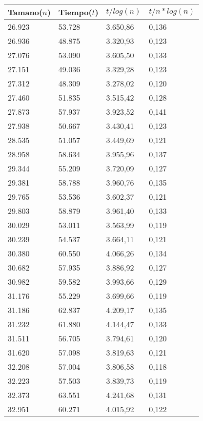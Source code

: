 \begin{table}[H]
\parbox{0.3\textwidth}{
  \begin{tabular}{| l | l | l |l |}
    \hline
    Tamano($n$) & Tiempo($t$) & $t / log(n)$ & $t / n*log(n)$ \\ \hline
26.923	&	53.728	&	3.650,86	&	0,136	\\ \hline
26.936	&	48.875	&	3.320,93	&	0,123	\\ \hline
27.076	&	53.090	&	3.605,50	&	0,133	\\ \hline
27.151	&	49.036	&	3.329,28	&	0,123	\\ \hline
27.312	&	48.309	&	3.278,02	&	0,120	\\ \hline
27.460	&	51.835	&	3.515,42	&	0,128	\\ \hline
27.873	&	57.937	&	3.923,52	&	0,141	\\ \hline
27.938	&	50.667	&	3.430,41	&	0,123	\\ \hline
28.535	&	51.057	&	3.449,69	&	0,121	\\ \hline
28.958	&	58.634	&	3.955,96	&	0,137	\\ \hline
29.344	&	55.209	&	3.720,09	&	0,127	\\ \hline
29.381	&	58.788	&	3.960,76	&	0,135	\\ \hline
29.765	&	53.536	&	3.602,37	&	0,121	\\ \hline
29.803	&	58.879	&	3.961,40	&	0,133	\\ \hline
30.029	&	53.011	&	3.563,99	&	0,119	\\ \hline
30.239	&	54.537	&	3.664,11	&	0,121	\\ \hline
30.380	&	60.550	&	4.066,26	&	0,134	\\ \hline
30.682	&	57.935	&	3.886,92	&	0,127	\\ \hline
30.982	&	59.582	&	3.993,66	&	0,129	\\ \hline
31.176	&	55.229	&	3.699,66	&	0,119	\\ \hline
31.186	&	62.837	&	4.209,17	&	0,135	\\ \hline
31.232	&	61.880	&	4.144,47	&	0,133	\\ \hline
31.511	&	56.705	&	3.794,61	&	0,120	\\ \hline
31.620	&	57.098	&	3.819,63	&	0,121	\\ \hline
32.208	&	57.004	&	3.806,58	&	0,118	\\ \hline
32.223	&	57.503	&	3.839,73	&	0,119	\\ \hline
32.373	&	63.551	&	4.241,68	&	0,131	\\ \hline
32.951	&	60.271	&	4.015,92	&	0,122	\\ \hline

\end{tabular}}
\end{table}
